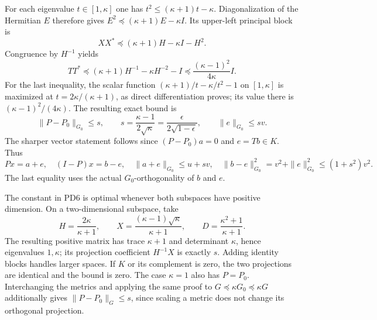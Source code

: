 \documentclass[11pt]{article}
\begin{document}
For each eigenvalue $t\in[1,\kappa]$ one has
$t^2\le(\kappa+1)t-\kappa$.  Diagonalization of the Hermitian
$E$ therefore gives
$E^2\preceq(\kappa+1)E-\kappa I$.  Its upper-left principal block is
\[
 XX^*\preceq(\kappa+1)H-\kappa I-H^2.
\]
Congruence by $H^{-1}$ yields
\[
 TT^*\preceq(\kappa+1)H^{-1}-\kappa H^{-2}-I
           \preceq\frac{(\kappa-1)^2}{4\kappa}I.                 \tag{PD5}
\]
For the last inequality, the scalar function
$(\kappa+1)/t-\kappa/t^2-1$ on $[1,\kappa]$ is maximized at
$t=2\kappa/(\kappa+1)$, as direct differentiation proves; its
value there is $(\kappa-1)^2/(4\kappa)$.  The resulting exact bound is
\[
 \boxed{\|P-P_0\|_{G_0}\le s,
 \qquad s=\frac{\kappa-1}{2\sqrt\kappa}
          =\frac{\epsilon}{2\sqrt{1-\epsilon}},\qquad
 \|e\|_{G_0}\le s v.}                                           \tag{PD6}
\]
The sharper vector statement follows since $(P-P_0)a=0$ and
$e=Tb\in K$.  Thus
\[
 Px=a+e,\quad(I-P)x=b-e,\quad
 \|a+e\|_{G_0}\le u+sv,\quad
 \|b-e\|_{G_0}^2=v^2+\|e\|_{G_0}^2\le(1+s^2)v^2.              \tag{PD7}
\]
The last equality uses the actual $G_0$-orthogonality of $b$ and $e$.

The constant in PD6 is optimal whenever both subspaces have positive
dimension.  On a two-dimensional subspace, take
\[
 H=\frac{2\kappa}{\kappa+1},\qquad
 X=\frac{(\kappa-1)\sqrt\kappa}{\kappa+1},\qquad
 D=\frac{\kappa^2+1}{\kappa+1}.                                  \tag{PD8}
\]
The resulting positive matrix has trace $\kappa+1$ and determinant
$\kappa$, hence eigenvalues $1,\kappa$; its projection coefficient
$H^{-1}X$ is exactly $s$.  Adding identity blocks handles larger
spaces.  If $K$ or its complement is zero, the two projections
are identical and the bound is zero.  The case $\kappa=1$ also
has $P=P_0$.  Interchanging the metrics and applying the same proof
to $G\preceq\kappa G_0\preceq\kappa G$ additionally gives
$\|P-P_0\|_G\le s$, since scaling a metric does not change its
orthogonal projection.
\end{document}
